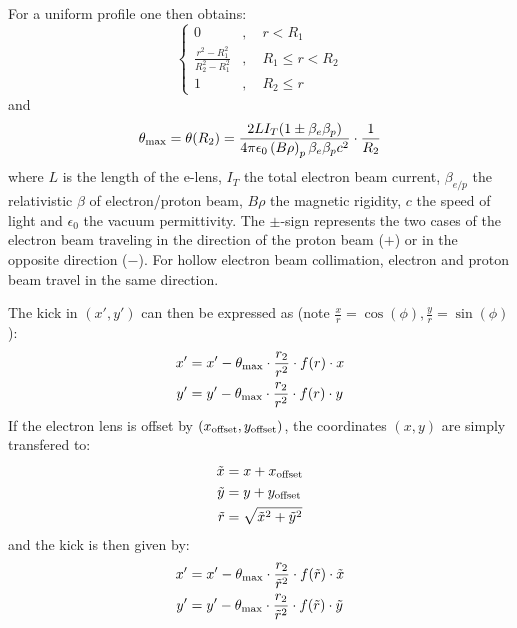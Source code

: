 For a uniform profile one then obtains:
\begin{equation}
\begin{cases} 0 &,\quad r< R_1\\
\frac{r^2-R_1^2}{R_2^2-R_1^2} &,\quad R_1 \leq r < R_2\\
1 &,\quad R_2 \leq r
\end{cases}
\end{equation}
and
\begin{equation}
\theta_{\rm max} = \theta(R_2) = \frac{2LI_T(1\pm\beta_e\beta_p)}{4\pi\epsilon_0  \left(B\rho\right)_p\beta_e\beta_p c^2}\cdot\frac{1}{R_2}
\end{equation}
where $L$ is the length of the e-lens, $I_T$ the total electron beam current, $\beta_{e/p}$ the relativistic $\beta$ of electron/proton beam, $B\rho$ the magnetic rigidity, $c$ the speed of light and $\epsilon_0$ the vacuum permittivity. The $\pm$-sign represents the two cases of the electron beam traveling in the direction of the proton beam ($+$) or in the opposite direction ($-$). For hollow electron beam collimation, electron and proton beam travel in the same direction.

The kick in $(x',y')$ can then be expressed as (note $\frac{x}{r}=\cos(\phi),\frac{y}{r}=\sin(\phi)$):
\begin{align}
x'&=x'-\theta_{\rm max}\cdot\frac{r_2}{r^2}\cdot f(r)\cdot x\\
y'&=y'-\theta_{\rm max}\cdot\frac{r_2}{r^2}\cdot f(r)\cdot y
\end{align}
If the electron lens is offset by $(x_{\rm offset},y_{\rm offset})$, the coordinates $(x,y)$ are simply transfered to:
\begin{align}
\tilde x&=x+x_{\rm offset}\\
\tilde y&=y+y_{\rm offset}\\
\tilde r&=\sqrt{\tilde x^2+\tilde y^2}
\end{align}
and the kick is then given by:
\begin{align}
x'&=x'-\theta_{\rm max}\cdot\frac{r_2}{\tilde r^2}\cdot f(\tilde r)\cdot \tilde x\\
y'&=y'-\theta_{\rm max}\cdot\frac{r_2}{\tilde r^2}\cdot f(\tilde r)\cdot \tilde y
\end{align}

